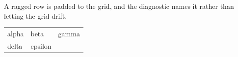 \documentclass{article}
\begin{document}
A ragged row is padded to the grid, and the diagnostic names it rather
than letting the grid drift.

\begin{tabular}{lll}
  \toprule
  alpha & beta & gamma \\
  delta & epsilon \\
  \bottomrule
\end{tabular}
\end{document}
